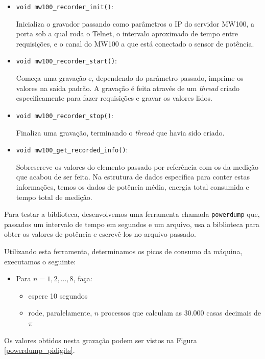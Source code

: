 \begin{itemize}
\item {\tt void mw100\_recorder\_init()}:

Inicializa o gravador passando como parâmetros o IP do servidor MW100, a porta sob a qual roda o Telnet, o intervalo aproximado de tempo entre requisições, e o canal do MW100 a que está conectado o sensor de potência.

\item {\tt void mw100\_recorder\_start()}:

Começa uma gravação e, dependendo do parâmetro passado, imprime os valores na saída padrão. A gravação é feita através de um \emph{thread} criado especificamente para fazer requisições e gravar os valores lidos.

\item {\tt void mw100\_recorder\_stop()}:

Finaliza uma gravação, terminando o \emph{thread} que havia sido criado.


\item {\tt void mw100\_get\_recorded\_info()}:

Sobrescreve os valores do elemento passado por referência com os da medição que acabou de ser feita. Na estrutura de dados específica para conter estas informações, temos os dados de potência média, energia total consumida e tempo total de medição.

\end{itemize}

Para testar a biblioteca, desenvolvemos uma ferramenta chamada {\tt powerdump} que, passados um intervalo de tempo em segundos e um arquivo, usa a biblioteca para obter os valores de potência e escrevê-los no arquivo passado. 

Utilizando esta ferramenta, determinamos os picos de consumo da máquina, executamos o seguinte:
\begin{itemize}
\item Para $ n = 1, 2, ..., 8 $, faça:
 \begin{itemize}
  \item espere 10 segundos
  \item rode, paralelamente, $ n $ processos que calculam as 30.000 casas decimais de $ \pi $
 \end{itemize}
\end{itemize}

Os valores obtidos nesta gravação podem ser vistos na Figura \ref{powerdump_pidigits}.

